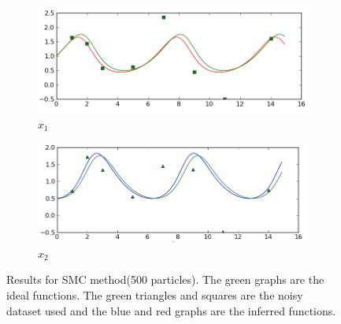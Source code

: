 \documentclass[12pt,a4paper,titlepage]{article}
\begin{document}
\begin{figure}
\centering
\begin{subfigure}{.52\linewidth}
  \centering
  \includegraphics[scale=0.48]{smc500_x1.png}
  \caption{$x_{1}$}
  \label{fig:smcx1}
\end{subfigure}%
\begin{subfigure}{.5\linewidth}
  \centering
  \includegraphics[scale=0.48]{smc500_x2.png}
  \caption{$x_{2}$}
  \label{fig:smcx2}
\end{subfigure}
\caption{Results for SMC method(500 particles). The green graphs are the ideal functions. The green triangles and squares are the noisy dataset used and the blue and red graphs are the inferred functions.}
\label{fig:smcres}
\end{figure}
\end{document}
